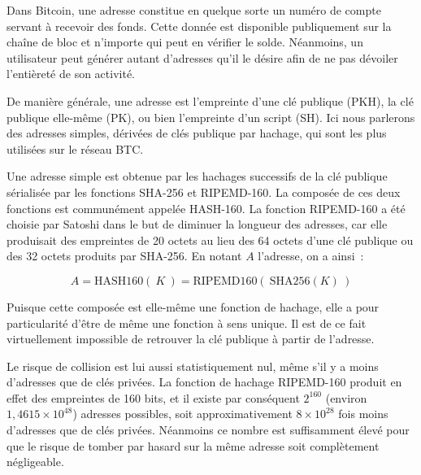 Dans Bitcoin, une adresse constitue en quelque sorte un numéro de compte servant à recevoir des fonds. Cette donnée est disponible publiquement sur la chaîne de bloc et n'importe qui peut en vérifier le solde. Néanmoins, un utilisateur peut générer autant d'adresses qu'il le désire afin de ne pas dévoiler l'entièreté de son activité.

De manière générale, une adresse est l'empreinte d'une clé publique (PKH), la clé publique elle-même (PK), ou bien l'empreinte d'un script (SH). Ici nous parlerons des adresses simples, dérivées de clés publique par hachage, qui sont les plus utilisées sur le réseau BTC.

Une adresse simple est obtenue par les hachages successifs de la clé publique sérialisée par les fonctions SHA-256 et RIPEMD-160. La composée de ces deux fonctions est communément appelée HASH-160. La fonction RIPEMD-160 a été choisie par Satoshi dans le but de diminuer la longueur des adresses, car elle produisait des empreintes de 20 octets au lieu des 64 octets d'une clé publique ou des 32 octets produits par SHA-256. En notant $A$ l'adresse, on a ainsi~:

{ \small
\[
A = \mathrm{HASH160}(~K~) = \mathrm{RIPEMD160}(~\mathrm{SHA256}( K )~)
\]
}

Puisque cette composée est elle-même une fonction de hachage, elle a pour particularité d'être de même une fonction à sens unique. Il est de ce fait virtuellement impossible de retrouver la clé publique à partir de l'adresse.

Le risque de collision est lui aussi statistiquement nul, même s'il y a moins d'adresses que de clés privées. La fonction de hachage RIPEMD-160 produit en effet des empreintes de 160 bits, et il existe par conséquent $2^{160}$ (environ $1,4615 \times 10^{48}$) adresses possibles, soit approximativement $8 \times 10^{28}$ fois moins d'adresses que de clés privées. Néanmoins ce nombre est suffisamment élevé pour que le risque de tomber par hasard sur la même adresse soit complètement négligeable.

